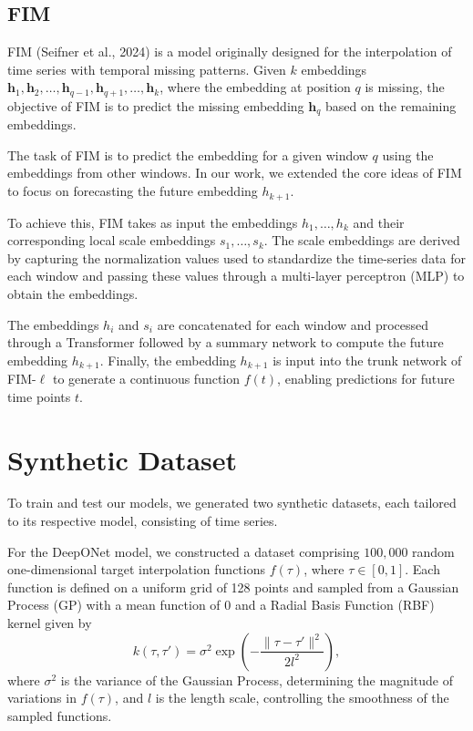 \documentclass{article}
\theoremstyle{plain}
\theoremstyle{definition}
\theoremstyle{remark}
\begin{document}
\subsection{FIM}\label{sec:FIM_arwin}
FIM (Seifner et al., 2024) is a model originally designed for the interpolation of time series with temporal missing patterns. Given \( k \) embeddings \( \mathbf{h}_1, \mathbf{h}_2, \ldots, \mathbf{h}_{q-1}, \mathbf{h}_{q+1}, \ldots, \mathbf{h}_k \), where the embedding at position \( q \) is missing, the objective of FIM is to predict the missing embedding \( \mathbf{h}_q \) based on the remaining embeddings.

The task of FIM is to predict the embedding for a given window \( q \) using the embeddings from other windows. In our work, we extended the core ideas of FIM to focus on forecasting the future embedding \( h_{k+1} \).

To achieve this, FIM takes as input the embeddings \( h_1, \ldots, h_k \) and their corresponding local scale embeddings \( s_1, \ldots, s_k \). The scale embeddings are derived by capturing the normalization values used to standardize the time-series data for each window and passing these values through a multi-layer perceptron (MLP) to obtain the embeddings.

The embeddings \( h_i \) and \( s_i \) are concatenated for each window and processed through a Transformer followed by a summary network to compute the future embedding \( h_{k+1} \). Finally, the embedding \( h_{k+1} \) is input into the trunk network of FIM-$\ell$ to generate a continuous function \( f(t) \), enabling predictions for future time points \( t \).

\section{Synthetic Dataset}
\label{sec:dataset_arwin}
To train and test our models, we generated two synthetic datasets, each tailored to its respective model, consisting of time series.

For the DeepONet model, we constructed a dataset comprising \( 100{,}000 \) random one-dimensional target interpolation functions \( f(\tau) \), where \( \tau \in [0, 1] \). Each function is defined on a uniform grid of 128 points and sampled from a Gaussian Process (GP) with a mean function of \( 0 \) and a Radial Basis Function (RBF) kernel given by
\[
k(\tau, \tau') = \sigma^2 \exp\left(-\frac{\|\tau - \tau'\|^2}{2l^2}\right),
\]
where \( \sigma^2 \) is the variance of the Gaussian Process, determining the magnitude of variations in \( f(\tau) \), and \( l \) is the length scale, controlling the smoothness of the sampled functions.
\end{document}
